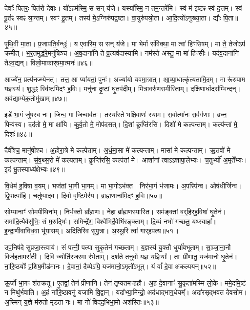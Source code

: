 देवाः᳚ पितरः॒ पित॑रो देवाः।
यो॑ऽहम॑स्मि॒ स सन् य॑जे।
यस्या᳚स्मि॒ न तम॒न्तरे॑मि।
स्वं म॑ इ॒ष्टꣴ स्वं द॒त्तम्।
स्वं पू॒र्तꣴ स्वꣴ श्रा॒न्तम्।
स्वꣳ हु॒तम्।
तस्य॑ मे॒\-ऽग्निरु॑पद्र॒ष्टा।
वा॒युरु॑पश्रो॒ता।
आ॒दि॒त्यो॑\-ऽनुख्या॒ता।
द्यौः पि॒ता॥४५॥\ip

पृ॒थि॒वी मा॒ता।
प्र॒जा\-प॑ति॒र्बन्धुः॑।
य ए॒वास्मि॒ स सन् य॑जे।
मा भेर्मा संवि॑क्था॒ मा त्वा॑ हिꣳसिषम्।
मा ते॒ तेजोऽप॑ क्रमीत्।
भ॒र॒तमुद्ध॑रे॒मनु॑षिञ्च।
अ॒व॒दाना॑नि ते प्र॒त्यव॑दास्यामि।
नम॑स्ते अस्तु॒ मा मा॑ हिꣳसीः।
यद॑व॒दाना॑नि तेऽव॒द्यन्।
विलो॒माका॑र्‌\mbox{}षमा॒त्मनः॑॥४६॥\ip

आज्ये॑न॒ प्रत्य॑नज्म्येनत्।
तत्त॒ आ प्या॑यतां॒ पुनः॑।
अज्या॑यो यवमा॒त्रात्।
आ॒व्या॒धात्कृ॑त्यतामि॒दम्।
मा रू॑रुपाम य॒ज्ञस्य॑।
शु॒द्धꣴ स्वि॑ष्टमि॒दꣳ ह॒विः।
मनु॑ना दृ॒ष्टां घृ॒तप॑दीम्।
मि॒त्रावरु॑णसमीरिताम्।
द॒क्षि॒णा॒र्धादस॑म्भिन्दन्।
अव॑द्याम्ये\-क॒तोमु॑खाम्॥४७॥\ip

इडे॑ भा॒गं जु॑षस्व नः।
जिन्व॒ गा जिन्वार्व॑तः।
तस्या᳚स्ते भक्षि॒वाणः॑ स्याम।
स॒र्वात्मा॑नः स॒र्वग॑णाः।
ब्रध्न॒ पिन्व॑स्व।
दद॑तो मे॒ मा क्षा॑यि।
कु॒र्व॒तो मे॒ मोप॑दसत्।
दि॒शां कॢप्ति॑रसि।
दिशो॑ मे कल्पन्ताम्।
कल्प॑न्तां मे॒ दिशः॑॥४८॥\ip

दैवी᳚श्च॒ मानु॑षीश्च।
अ॒हो॒रा॒त्रे मे॑ कल्पेताम्।
अ॒र्ध॒मा॒सा मे॑ कल्पन्ताम्।
मासा॑ मे कल्पन्ताम्।
ऋ॒तवो॑ मे कल्पन्ताम्।
सं॒व॒थ्स॒रो मे॑ कल्पताम्।
कॢप्ति॑रसि॒ कल्प॑तां मे।
आशा॑नां त्वा\-ऽऽशापा॒लेभ्यः॑।
च॒तुर्भ्यो॑ अ॒मृते᳚भ्यः।
इ॒दं भू॒तस्याध्य॑क्षेभ्यः॥४९॥\ip

वि॒धेम॑ ह॒विषा॑ व॒यम्।
भज॑तां भा॒गी भा॒गम्।
मा भा॒गो\-ऽभ॑क्त।
निर॑भा॒गं भ॑जामः।
अ॒पस्पि॑न्व।
ओष॑धीर्जिन्व।
द्वि॒पात्पा॑हि।
चतु॑ष्पादव।
दि॒वो वृष्टि॒मेर॑य।
ब्रा॒ह्म॒णाना॑मि॒दꣳ ह॒विः॥५०॥\ip

सो॒म्यानाꣳ॑ सोमपी॒थिना᳚म्।
निर्भ॒क्तो ब्रा᳚ह्मणः।
नेहा ब्रा᳚ह्मणस्यास्ति।
सम॑ङ्क्तां ब॒र्॒हिर्‌\mbox{}ह॒विषा॑ घृ॒तेन॑।
समा॑दि॒त्यैर्वसु॑भिः॒ सं म॒रुद्भिः॑।
समिन्द्रे॑ण॒ विश्वे॑भिर्दे॒वेभि॑रङ्क्ताम्।
दि॒व्यं नभो॑ गच्छतु॒ यथ्स्वाहा᳚।
इ॒न्द्रा॒णीवा॑विध॒वा भू॑यासम्।
अदि॑तिरिव सुपु॒त्रा।
अ॒स्थू॒रि त्वा॑ गार्‌\mbox{}हपत्य॥५१॥\ip

उप॒निष॑दे सुप्रजा॒स्त्वाय॑।
सं पत्नी॒ पत्या॑ सुकृ॒तेन॑ गच्छताम्।
य॒ज्ञस्य॑ यु॒क्तौ धुर्या॑वभूताम्।
स॒ञ्जा॒ना॒नौ विज॑हता॒मरा॑तीः।
दि॒वि ज्योति॑र॒जर॒मा र॑भेताम्।
दश॑ते त॒नुवो॑ यज्ञ य॒ज्ञियाः᳚।
ताः प्री॑णातु॒ यज॑मानो घृ॒तेन॑।
ना॒रि॒ष्ठयोः᳚ प्र॒शिष॒मीड॑मानः।
दे॒वानां॒ दैव्येऽपि॒ यज॑मानो॒\-ऽमृतो॑\-ऽभूत्।
यं वां᳚ दे॒वा अ॑कल्पयन्॥५२॥\ip

ऊ॒र्जो भा॒गꣳ श॑तक्रतू।
ए॒तद्वां॒ तेन॑ प्रीणानि।
तेन॑ तृप्यतमꣳहहौ।
अ॒हं दे॒वानाꣳ॑ सु॒कृता॑मस्मि लो॒के।
ममे॒दमि॒ष्टं न मिथु॑र्भवाति।
अ॒हं ना॑रि॒ष्ठावनु॑ यजामि वि॒द्वान्।
यदा᳚भ्या॒मिन्द्रो॒ अद॑धाद्भाग॒\-धेयम्᳚।
अदा॑रसृद्भवत देवसोम।
अ॒स्मिन् य॒ज्ञे म॑रुतो मृडता नः।
मा नो॑ विदद॒भिभा॒मो अश॑स्तिः॥५३॥\ip

